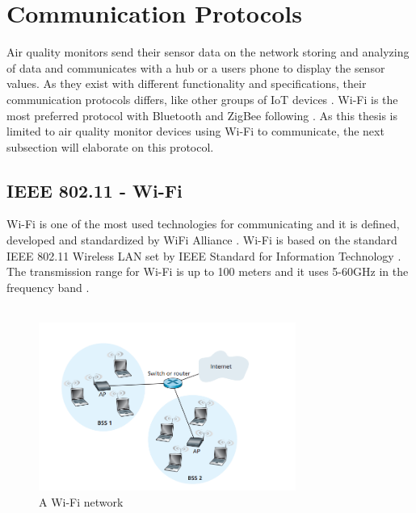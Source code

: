 \section{Communication Protocols}
Air quality monitors send their sensor data on the network storing and analyzing of data and communicates with a hub or a users phone to display the sensor values. As they exist with different functionality and specifications, their communication protocols differs, like other groups of \gls{IoT} devices \cite{AQMBigSource}. \gls{Wi-Fi} is the most preferred protocol with Bluetooth and ZigBee following \cite{saini2020indoor}. As this thesis is limited to air quality monitor devices using \gls{Wi-Fi} to communicate, the next subsection will elaborate on this protocol.

\subsection{IEEE 802.11 - Wi-Fi}
\gls{Wi-Fi} \cite{WiFiAlliance} is one of the most used technologies for communicating and it is defined, developed and standardized by WiFi Alliance \cite{WiFiAlliance}. \gls{Wi-Fi} is based on the standard IEEE 802.11 Wireless LAN set by IEEE Standard for Information Technology \cite{WifiStandard}. The transmission range for \gls{Wi-Fi} is up to 100 meters and it uses 5-60GHz in the frequency band \cite{IAQMonitorCommunicationReview}.
\\\\
\begin{figure} [H]
    \centering
    \includegraphics[width=0.75\textwidth]{figures/WiFiStandard.png}
    \caption{A \gls{Wi-Fi} network \cite{Datacom}}
    \label{fig:WiFiStandard}
\end{figure}

